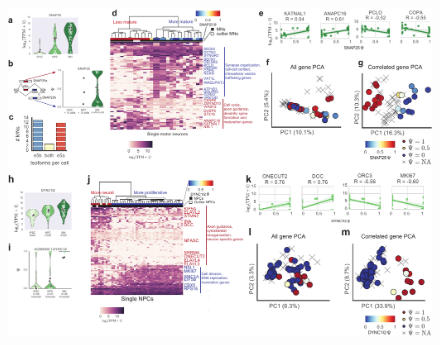 \begin{figure}[h]
\ContinuedFloat
\captionsetup{labelformat=empty}
\centering
\includegraphics[width=5.8in]{figures/hidden_cell_states.pdf}
\end{figure}
\clearpage


